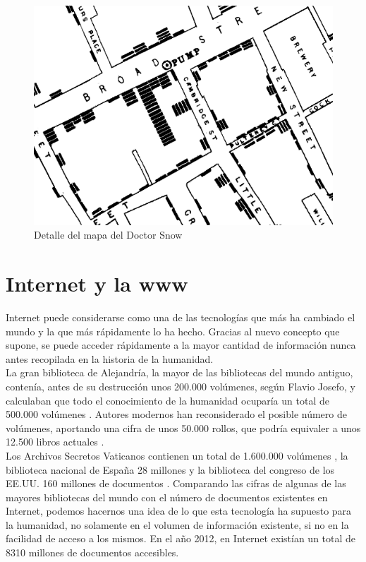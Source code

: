 \begin{figure}[h!btp]
\centering
\includegraphics[scale=0.5, fbox={\fboxrule} 4mm]{images/03-antecedentes/03-cholera_map_detail.png}
\caption{Detalle del mapa del Doctor Snow}
\label{fig:cholera_map_detail}
\end{figure}

\section{Internet y la \ac{www}}

Internet puede considerarse como una de las tecnologías que más ha cambiado el mundo y la que más rápidamente lo ha hecho. Gracias al nuevo concepto que supone, se puede acceder rápidamente a la mayor cantidad de información nunca antes recopilada en la historia de la humanidad.\\

La gran biblioteca de Alejandría, la mayor de las bibliotecas del mundo antiguo, contenía, antes de su destrucción unos 200.000 volúmenes, según Flavio Josefo, y calculaban que todo el conocimiento de la humanidad ocuparía un total de 500.000 volúmenes  \cite{Jos94}. Autores modernos han reconsiderado el posible número de volúmenes, aportando una cifra de unos 50.000 rollos, que podría equivaler a unos 12.500 libros actuales \cite{Esco01}.\\

Los Archivos Secretos Vaticanos contienen un total de 1.600.000 volúmenes \cite{Bav15}, la biblioteca nacional de España 28 millones \cite{Sanz15} y la biblioteca del congreso de los \ac{EE.UU.} 160 millones de documentos \cite{Libr15}. Comparando las cifras de algunas de las mayores bibliotecas del mundo con el número de documentos existentes en Internet, podemos hacernos una idea de lo que esta tecnología ha supuesto para la humanidad, no solamente en el volumen de información existente, si no en la facilidad de acceso a los mismos. En el año 2012, en Internet existían un total de 8310 millones de documentos accesibles.

